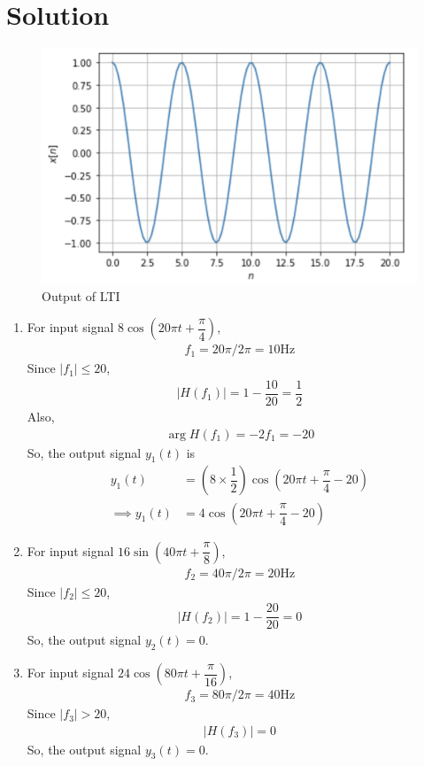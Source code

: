 \documentclass[journal,12pt,twocolumn]{IEEEtran}
\begin{document}
\section{Solution}
\begin{figure}[h]
         \includegraphics[width=\columnwidth]{figure.png}
         \caption{Output of LTI}
         \label{plot}
\end{figure}
\begin{enumerate}
    \item 
        For input signal $8\cos\left(20\pi t+\dfrac{\pi}{4}\right)$,
        \begin{align}
            f_1=20\pi/2\pi=10\text{Hz}
        \end{align}
        Since $|f_1|\leq20$,
        \begin{align}
            |H(f_1)|=1-\dfrac{10}{20}=\dfrac{1}{2}
        \end{align}
        Also,
        \begin{align}
            \arg H(f_1)=-2f_1=-20
        \end{align}
        So, the output signal $y_1(t)$ is 
        \begin{align}
            y_1(t)&=\left(8\times\dfrac{1}{2}\right)\cos\left(20\pi t+\dfrac{\pi}{4}-20\right)\\
            \implies y_1(t)&= 4\cos\left(20\pi t+\dfrac{\pi}{4}-20\right)
        \end{align}
    \item
        For input signal $16\sin\left(40\pi t+\dfrac{\pi}{8}\right)$,
        \begin{align}
            f_2=40\pi/2\pi=20\text{Hz}
        \end{align}
        Since $|f_2|\leq20$,
        \begin{align}
            |H(f_2)|=1-\dfrac{20}{20}=0
        \end{align}
        So, the output signal $y_2(t)=0$.
    \item
        For input signal $24\cos\left(80\pi t+\dfrac{\pi}{16}\right)$,
        \begin{align}
            f_3=80\pi/2\pi=40\text{Hz}
        \end{align}
        Since $|f_3|>20$,
        \begin{align}
            |H(f_3)|=0
        \end{align}
        So, the output signal $y_3(t)=0$.
\end{enumerate}
\end{document}
